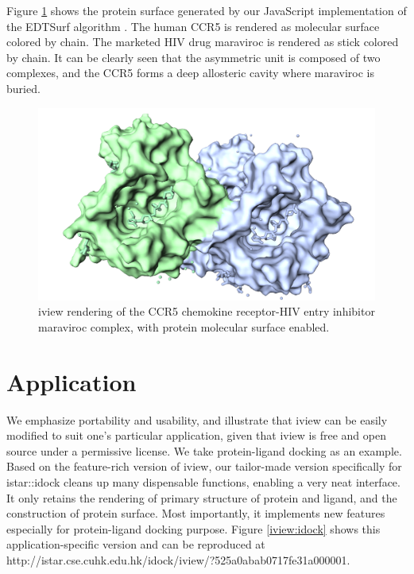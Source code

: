 Figure \ref{iview:surface} shows the protein surface generated by our JavaScript implementation of the EDTSurf algorithm \citep{1297,1350}. The human CCR5 is rendered as molecular surface colored by chain. The marketed HIV drug maraviroc is rendered as stick colored by chain. It can be clearly seen that the asymmetric unit is composed of two complexes, and the CCR5 forms a deep allosteric cavity where maraviroc is buried.

\begin{figure}
\begin{center}
\includegraphics[width=\linewidth]{../iview/surface.png}
\end{center}
\caption{iview rendering of the CCR5 chemokine receptor-HIV entry inhibitor maraviroc complex, with protein molecular surface enabled.}
\label{iview:surface}
\end{figure}

\section{Application}

We emphasize portability and usability, and illustrate that iview can be easily modified to suit one's particular application, given that iview is free and open source under a permissive license. We take protein-ligand docking as an example. Based on the feature-rich version of iview, our tailor-made version specifically for istar::idock cleans up many dispensable functions, enabling a very neat interface. It only retains the rendering of primary structure of protein and ligand, and the construction of protein surface. Most importantly, it implements new features especially for protein-ligand docking purpose. Figure \ref{iview:idock} shows this application-specific version and can be reproduced at http://istar.cse.cuhk.edu.hk/idock/iview/?525a0abab0717fe31a000001.


